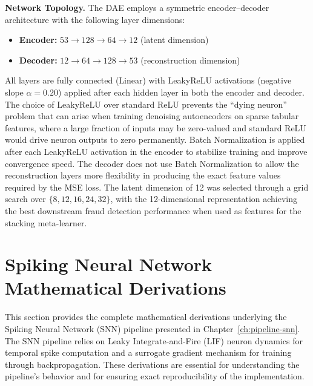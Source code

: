 \textbf{Network Topology.} The DAE employs a symmetric encoder--decoder architecture with the following layer dimensions:
\begin{itemize}
\item \textbf{Encoder:} $53 \to 128 \to 64 \to 12$ (latent dimension)
\item \textbf{Decoder:} $12 \to 64 \to 128 \to 53$ (reconstruction dimension)
\end{itemize}
All layers are fully connected (Linear) with LeakyReLU activations (negative slope $\alpha = 0.20$) applied after each hidden layer in both the encoder and decoder. The choice of LeakyReLU over standard ReLU prevents the ``dying neuron'' problem that can arise when training denoising autoencoders on sparse tabular features, where a large fraction of inputs may be zero-valued and standard ReLU would drive neuron outputs to zero permanently. Batch Normalization is applied after each LeakyReLU activation in the encoder to stabilize training and improve convergence speed. The decoder does not use Batch Normalization to allow the reconstruction layers more flexibility in producing the exact feature values required by the MSE loss. The latent dimension of 12 was selected through a grid search over $\{8, 12, 16, 24, 32\}$, with the 12-dimensional representation achieving the best downstream fraud detection performance when used as features for the stacking meta-learner.

\section{Spiking Neural Network Mathematical Derivations}
\label{app:extended-snn-math}

This section provides the complete mathematical derivations underlying the Spiking Neural Network (SNN) pipeline presented in Chapter~\ref{ch:pipeline-snn}. The SNN pipeline relies on Leaky Integrate-and-Fire (LIF) neuron dynamics for temporal spike computation and a surrogate gradient mechanism for training through backpropagation. These derivations are essential for understanding the pipeline's behavior and for ensuring exact reproducibility of the implementation.

